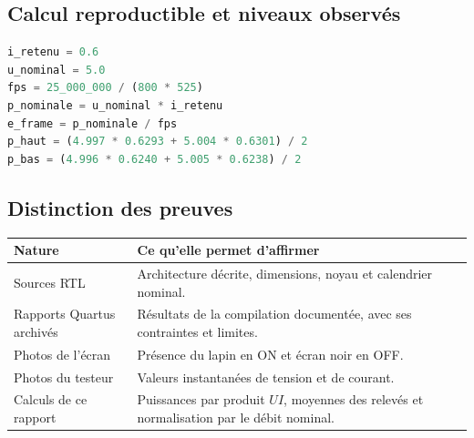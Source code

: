 \documentclass[11pt,a4paper]{article}
\begin{document}
\subsection*{Calcul reproductible et niveaux observés}
\begin{lstlisting}[language=Python]
i_retenu = 0.6
u_nominal = 5.0
fps = 25_000_000 / (800 * 525)
p_nominale = u_nominal * i_retenu
e_frame = p_nominale / fps
p_haut = (4.997 * 0.6293 + 5.004 * 0.6301) / 2
p_bas = (4.996 * 0.6240 + 5.005 * 0.6238) / 2
\end{lstlisting}

\subsection*{Distinction des preuves}
\begin{center}
\begin{tabularx}{\linewidth}{@{}l X@{}}
\toprule
Nature & Ce qu'elle permet d'affirmer\\
\midrule
Sources RTL & Architecture décrite, dimensions, noyau et calendrier nominal.\\
Rapports Quartus archivés & Résultats de la compilation documentée, avec ses contraintes et limites.\\
Photos de l'écran & Présence du lapin en ON et écran noir en OFF.\\
Photos du testeur & Valeurs instantanées de tension et de courant.\\
Calculs de ce rapport & Puissances par produit $UI$, moyennes des relevés et normalisation par le débit nominal.\\
\bottomrule
\end{tabularx}
\end{center}
\end{document}
